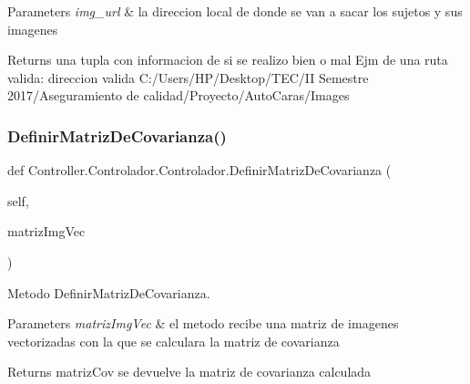 \begin{DoxyParams}{Parameters}
{\em img\+\_\+url} & la direccion local de donde se van a sacar los sujetos y sus imagenes \\
\hline
\end{DoxyParams}
\begin{DoxyReturn}{Returns}
una tupla con informacion de si se realizo bien o mal Ejm de una ruta valida\+: direccion valida C\+:/\+Users/\+H\+P/\+Desktop/\+T\+E\+C/\+II Semestre 2017/\+Aseguramiento de calidad/\+Proyecto/\+Auto\+Caras/\+Images 
\end{DoxyReturn}
\mbox{\label{class_controller_1_1_controlador_1_1_controlador_a4c342a4b7f56c2f8a566cdf62030816c}} 
\subsubsection{\texorpdfstring{Definir\+Matriz\+De\+Covarianza()}{DefinirMatrizDeCovarianza()}}
{\footnotesize\ttfamily def Controller.\+Controlador.\+Controlador.\+Definir\+Matriz\+De\+Covarianza (\begin{DoxyParamCaption}\item[{}]{self,  }\item[{}]{matriz\+Img\+Vec }\end{DoxyParamCaption})}



Metodo Definir\+Matriz\+De\+Covarianza. 


\begin{DoxyParams}{Parameters}
{\em matriz\+Img\+Vec} & el metodo recibe una matriz de imagenes vectorizadas con la que se calculara la matriz de covarianza \\
\hline
\end{DoxyParams}
\begin{DoxyReturn}{Returns}
matriz\+Cov se devuelve la matriz de covarianza calculada 
\end{DoxyReturn}
\mbox{\label{class_controller_1_1_controlador_1_1_controlador_a88254f919a6b1d7ed25e2f54b528a15c}} 
